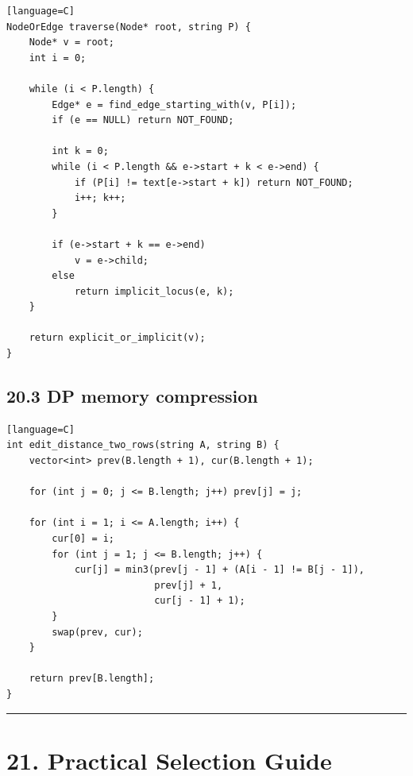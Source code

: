 \documentclass[11pt]{article}
\begin{document}
\begin{verbatim}[language=C]
NodeOrEdge traverse(Node* root, string P) {
    Node* v = root;
    int i = 0;

    while (i < P.length) {
        Edge* e = find_edge_starting_with(v, P[i]);
        if (e == NULL) return NOT_FOUND;

        int k = 0;
        while (i < P.length && e->start + k < e->end) {
            if (P[i] != text[e->start + k]) return NOT_FOUND;
            i++; k++;
        }

        if (e->start + k == e->end)
            v = e->child;
        else
            return implicit_locus(e, k);
    }

    return explicit_or_implicit(v);
}
\end{verbatim}

\subsection{20.3 DP memory compression}\label{dp-memory-compression}

\begin{verbatim}[language=C]
int edit_distance_two_rows(string A, string B) {
    vector<int> prev(B.length + 1), cur(B.length + 1);

    for (int j = 0; j <= B.length; j++) prev[j] = j;

    for (int i = 1; i <= A.length; i++) {
        cur[0] = i;
        for (int j = 1; j <= B.length; j++) {
            cur[j] = min3(prev[j - 1] + (A[i - 1] != B[j - 1]),
                          prev[j] + 1,
                          cur[j - 1] + 1);
        }
        swap(prev, cur);
    }

    return prev[B.length];
}
\end{verbatim}

\begin{center}\rule{0.5\linewidth}{0.5pt}\end{center}

\section{21. Practical Selection Guide}\label{practical-selection-guide}
\end{document}
